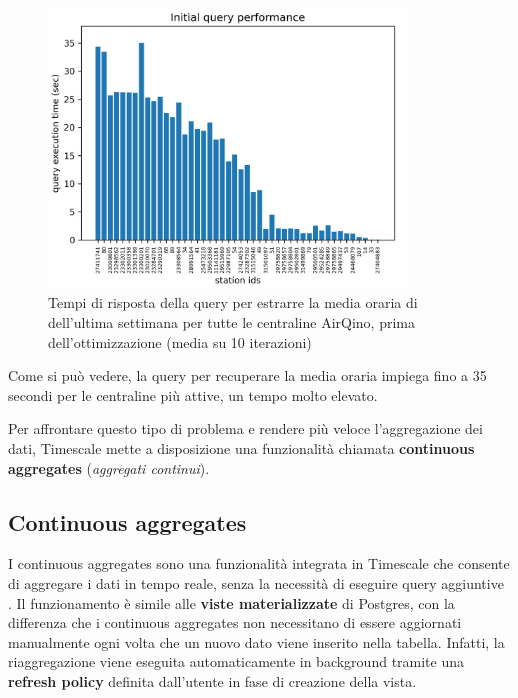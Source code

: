\begin{figure}[H]
\centering
\captionsetup{justification=centering}
\includegraphics[width=0.85\textwidth,height=\textheight,keepaspectratio]{img/query_prima}
\caption{Tempi di risposta della query per estrarre la media oraria di  dell'ultima settimana per tutte le centraline AirQino, prima dell'ottimizzazione (media su 10 iterazioni)}
\label{fig:query-prima}
\end{figure}

Come si può vedere, la query per recuperare la media oraria impiega fino a 35 secondi per le centraline più attive, un tempo molto elevato.

Per affrontare questo tipo di problema e rendere più veloce l'aggregazione dei dati, Timescale mette a disposizione una funzionalità chiamata \textbf{continuous aggregates} (\textit{aggregati continui}).

\subsection{Continuous aggregates}\label{ssec:cont-aggr}
I continuous aggregates sono una funzionalità integrata in Timescale che consente di aggregare i dati in tempo reale, senza la necessità di eseguire query aggiuntive \cite{timescale_ca_2}. Il funzionamento è simile alle \textbf{viste materializzate} di Postgres, con la differenza che i continuous aggregates non necessitano di essere aggiornati manualmente ogni volta che un nuovo dato viene inserito nella tabella. Infatti, la riaggregazione viene eseguita automaticamente in background tramite una \textbf{refresh policy} definita dall'utente in fase di creazione della vista.

